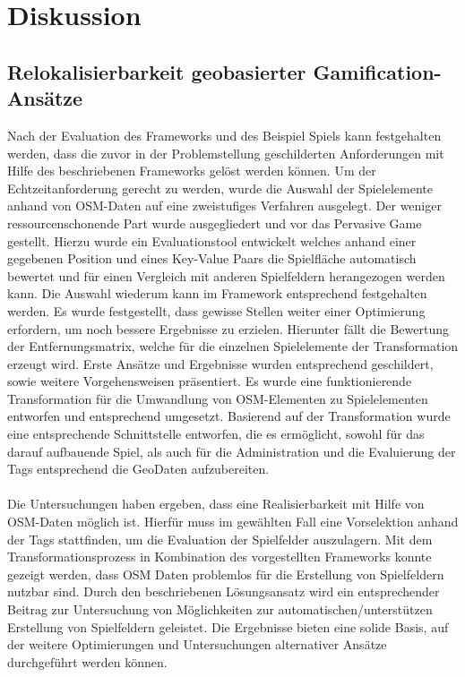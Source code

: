 \chapter{Diskussion}
\label{sec:S7_Diskussion}

\section{Relokalisierbarkeit geobasierter Gamification-Ansätze}

Nach der Evaluation des Frameworks und des Beispiel Spiels kann festgehalten werden, dass die zuvor in der Problemstellung geschilderten Anforderungen mit Hilfe des beschriebenen Frameworks gelöst werden können. Um der Echtzeitanforderung gerecht zu werden, wurde die Auswahl der Spielelemente anhand von OSM-Daten auf eine zweistufiges Verfahren ausgelegt. Der weniger ressourcenschonende Part wurde ausgegliedert und vor das Pervasive Game gestellt. Hierzu wurde ein Evaluationstool entwickelt welches anhand einer gegebenen Position und eines Key-Value Paars die Spielfläche automatisch bewertet und für einen Vergleich mit anderen Spielfeldern herangezogen werden kann.
Die Auswahl wiederum kann im Framework entsprechend festgehalten werden. Es wurde festgestellt, dass gewisse Stellen weiter einer Optimierung erfordern, um noch bessere Ergebnisse zu erzielen.
Hierunter fällt die Bewertung der Entfernungsmatrix, welche für die einzelnen Spielelemente der Transformation erzeugt wird. Erste Ansätze und Ergebnisse wurden entsprechend geschildert, sowie weitere Vorgehensweisen präsentiert.
Es wurde eine funktionierende Transformation für die Umwandlung von OSM-Elementen zu Spielelementen entworfen und entsprechend umgesetzt.
Basierend auf der Transformation wurde eine entsprechende Schnittstelle entworfen, die es ermöglicht, sowohl für das darauf aufbauende Spiel, als auch für die Administration und die Evaluierung der Tags entsprechend die GeoDaten aufzubereiten.
\\\\
Die Untersuchungen haben ergeben, dass eine Realisierbarkeit mit Hilfe von OSM-Daten möglich ist. Hierfür muss im gewählten Fall eine Vorselektion anhand der Tags stattfinden, um die Evaluation der Spielfelder auszulagern. Mit dem Transformationsprozess in Kombination des vorgestellten Frameworks konnte gezeigt werden, dass OSM Daten problemlos für die Erstellung von Spielfeldern nutzbar sind. Durch den beschriebenen Lösungsansatz wird ein entsprechender Beitrag zur Untersuchung von Möglichkeiten zur automatischen/unterstützen Erstellung von Spielfeldern geleistet. Die Ergebnisse bieten eine solide Basis, auf der weitere Optimierungen  und Untersuchungen alternativer Ansätze durchgeführt werden können.

